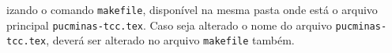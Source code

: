 izando o comando \verb|makefile|, disponível na mesma pasta onde está o arquivo principal \verb|pucminas-tcc.tex|. Caso seja alterado o nome do arquivo \verb|pucminas-tcc.tex|, deverá ser alterado no arquivo \verb|makefile| também.
